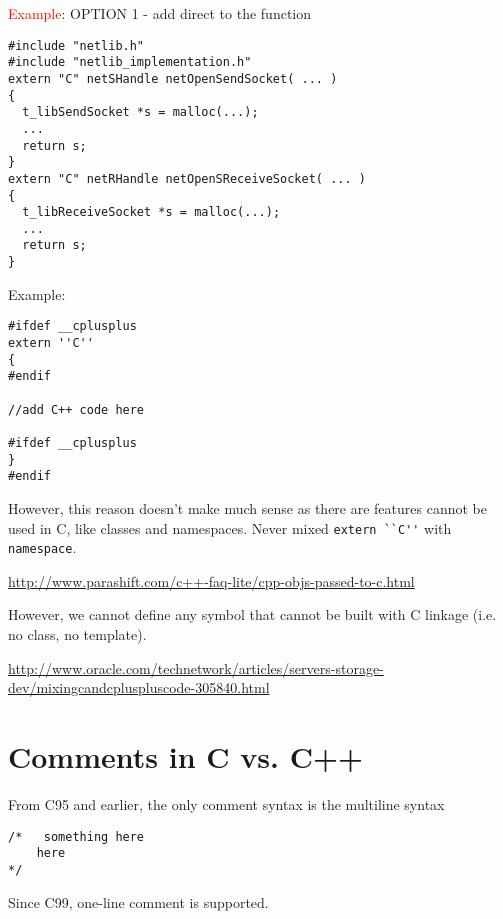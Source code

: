 \textcolor{red}{Example}: OPTION 1 - add direct to the function
\begin{verbatim}
#include "netlib.h"
#include "netlib_implementation.h"
extern "C" netSHandle netOpenSendSocket( ... )
{
  t_libSendSocket *s = malloc(...);
  ...
  return s;
}
extern "C" netRHandle netOpenSReceiveSocket( ... )
{
  t_libReceiveSocket *s = malloc(...);
  ...
  return s;
}
\end{verbatim}

Example:
\begin{verbatim}
#ifdef __cplusplus
extern ''C''
{
#endif

//add C++ code here

#ifdef __cplusplus
}
#endif
\end{verbatim}
However, this reason doesn't make much sense as there are features cannot be
used in C, like classes and namespaces. Never mixed \verb!extern ``C''! with
\verb!namespace!.

\url{http://www.parashift.com/c++-faq-lite/cpp-objs-passed-to-c.html}



% 
% 
% 

However, we cannot define any symbol that cannot be built with C linkage (i.e.
no class, no template).

\url{http://www.oracle.com/technetwork/articles/servers-storage-dev/mixingcandcpluspluscode-305840.html}







\section{Comments in C vs. C++}

From C95 and earlier, the only comment syntax is the multiline syntax
\begin{verbatim}
/*   something here
    here
*/
\end{verbatim}
Since C99, one-line comment is supported.


